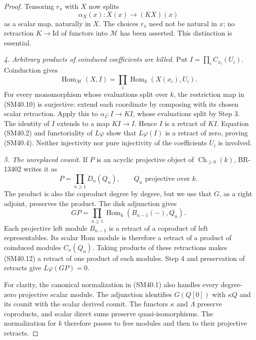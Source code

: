 \begin{proof}
Tensoring \(r_x\) with \(X\) now splits
\[
                     \alpha_X(x):X(x)\longrightarrow(KX)(x)
                                                               \tag{SM40.9}
\]
as a scalar map, naturally in \(X\).  The choices \(r_x\)
need not be natural in \(x\); no retraction \(K\to\mathrm{Id}\)
of functors into \(\mathcal M\) has been asserted.
This distinction is essential.

\emph{4. Arbitrary products of coinduced coefficients are killed.}
Put \(I=\prod_i C_{x_i}(U_i)\).  Coinduction gives
\[
 \operatorname{Hom}_{\mathcal M}(X,I)
             =\prod_i\operatorname{Hom}_k(X(x_i),U_i).       \tag{SM40.10}
\]
For every monomorphism whose evaluations split over \(k\),
the restriction map in (SM40.10) is surjective: extend each
coordinate by composing with its chosen scalar retraction.
Apply this to \(\alpha_I:I\to KI\), whose evaluations
split by Step 3.  The identity of \(I\) extends to a map
\(KI\to I\).  Hence \(I\) is a retract of \(KI\).
Equation (SM40.2) and functoriality of \(L\varphi\) show
that \(L\varphi(I)\) is a retract of zero, proving
(SM40.4).  Neither injectivity nor pure injectivity of
the coefficients \(U_i\) is involved.

\emph{5. The unreplaced counit.}
If \(P\) is an acyclic projective object of
\(\operatorname{Ch}_{\ge0}(k)\), BR-13402 writes it as
\[
           P=\prod_{n\ge1}D_n(Q_n),\qquad Q_n\text{ projective over }k.
                                                               \tag{SM40.11}
\]
The product is also the coproduct degree by degree, but
we use that \(G\), as a right adjoint, preserves the
product.  The disk adjunction gives
\[
            GP=\prod_{n\ge1}\operatorname{Hom}_k(B_{n-1}(-),Q_n).
                                                               \tag{SM40.12}
\]
Each projective left module \(B_{n-1}\) is a retract of
a coproduct of left representables.  Its scalar Hom
module is therefore a retract of a product of coinduced
modules \(C_x(Q_n)\).  Taking products of these retractions
makes (SM40.12) a retract of one product of such modules.
Step 4 and preservation of retracts give
\(L\varphi(GP)=0\).

For clarity, the canonical normalization in (SM40.1)
also handles every degree-zero projective scalar module.
The adjunction identifies \(G(Q[0])\) with \(\kappa Q\)
and its counit with the scalar derived counit.  The
functors \(\kappa\) and \(\Lambda\) preserve coproducts,
and scalar direct sums preserve quasi-isomorphisms.
The normalization for \(k\) therefore passes to free
modules and then to their projective retracts.


\end{proof}
